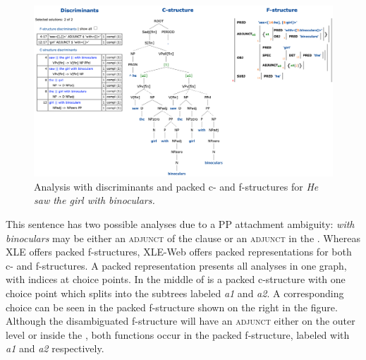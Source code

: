 \documentclass[output=paper,hidelinks]{langscibook}
\begin{document}

\begin{figure}
    \includegraphics[width=\textwidth]{figures/Treebanks/binoculars.png}
    \caption{Analysis with discriminants and packed c- and f-structures for \textit{He saw the girl with binoculars.}}
    \label{fig:binoculars}
\end{figure}

This sentence has two possible analyses due to a PP attachment ambiguity:  \textit{with binoculars} may be either an \textsc{adjunct} of the clause or an \textsc{adjunct} in the \OBJ.
Whereas XLE offers packed f-structures, XLE-Web offers packed representations for both c- and f-structures.
A packed representation presents all analyses in one graph, with indices at choice points.
In the middle of  is a packed c-structure with one choice point which splits into the subtrees labeled \emph{a1} and \emph{a2}.
A corresponding choice can be seen in the packed f-structure shown on the right in the figure.
Although the disambiguated f-structure will have an \textsc{adjunct} either on the outer level or inside the \OBJ, both functions occur in the packed f-structure, labeled with \textit{a1} and \textit{a2} respectively.
\end{document}
